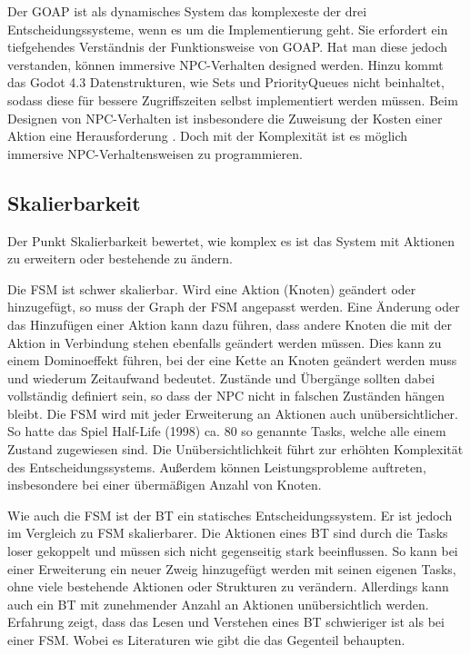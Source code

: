 Der GOAP ist als dynamisches System das komplexeste der drei Entscheidungssysteme, wenn es um die Implementierung geht. Sie erfordert ein tiefgehendes Verst\"{a}ndnis der Funktionsweise von GOAP. Hat man diese jedoch verstanden, k\"{o}nnen immersive NPC-Verhalten designed werden. Hinzu kommt das Godot 4.3 Datenstrukturen, wie Sets und PriorityQueues nicht beinhaltet, sodass diese f\"{u}r bessere Zugriffszeiten selbst implementiert werden m\"{u}ssen. Beim Designen von NPC-Verhalten ist insbesondere die Zuweisung der Kosten einer Aktion eine Herausforderung \autocite{Schwab2021}. Doch mit der Komplexit\"{a}t ist es m\"{o}glich immersive NPC-Verhaltensweisen zu programmieren.


\subsection{Skalierbarkeit}
\label{chap:skalierbarkeit}

Der Punkt Skalierbarkeit bewertet, wie komplex es ist das System mit Aktionen zu erweitern oder bestehende zu \"{a}ndern.

Die FSM ist schwer skalierbar. Wird eine Aktion (Knoten) ge\"{a}ndert oder hinzugef\"{u}gt, so muss der Graph der FSM angepasst werden. Eine \"{A}nderung oder das Hinzuf\"{u}gen einer Aktion kann dazu f\"{u}hren, dass andere Knoten die mit der Aktion in Verbindung stehen ebenfalls ge\"{a}ndert werden m\"{u}ssen. Dies kann zu einem Dominoeffekt f\"{u}hren, bei der eine Kette an Knoten ge\"{a}ndert werden muss und wiederum Zeitaufwand bedeutet. Zust\"{a}nde und \"{U}berg\"{a}nge sollten dabei vollst\"{a}ndig definiert sein, so dass der NPC nicht in falschen Zust\"{a}nden h\"{a}ngen bleibt. Die FSM wird mit jeder Erweiterung an Aktionen auch un\"{u}bersichtlicher. So hatte das Spiel Half-Life (1998) ca. 80 so genannte Tasks, welche alle einem Zustand zugewiesen sind.\autocite{U2023} Die Un\"{u}bersichtlichkeit f\"{u}hrt zur erh\"{o}hten Komplexit\"{a}t des Entscheidungssystems. Au\ss{}erdem k\"{o}nnen Leistungsprobleme auftreten, insbesondere bei einer \"{u}berm\"{a}\ss{}igen Anzahl von Knoten.\autocite{U2023}

Wie auch die FSM ist der BT ein statisches Entscheidungssystem. Er ist jedoch im Vergleich zu FSM skalierbarer. Die Aktionen eines BT sind durch die Tasks loser gekoppelt und m\"{u}ssen sich nicht gegenseitig stark beeinflussen. So kann bei einer Erweiterung ein neuer Zweig hinzugef\"{u}gt werden mit seinen eigenen Tasks, ohne viele bestehende Aktionen oder Strukturen zu ver\"{a}ndern.\autocite{aiag}  Allerdings kann auch ein BT mit zunehmender Anzahl an Aktionen un\"{u}bersichtlich werden. Erfahrung zeigt, dass das Lesen und Verstehen eines BT schwieriger ist als bei einer FSM. Wobei es Literaturen wie \autocite{} gibt die das Gegenteil behaupten.

